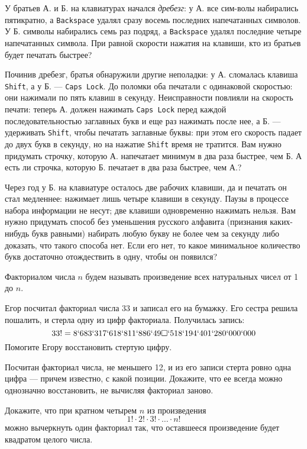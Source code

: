 \begin{itemize}
\itA У братьев А. и Б. на клавиатурах начался {\itshape дребезг}: у А. все сим-\linebreak волы набирались пятикратно, а {\verb!Backspace!} удалял сразу восемь последних напечатанных символов. У Б. символы набирались семь раз подряд, а {\verb!Backspace!} удалял последние четыре напечатанных символа. При равной скорости нажатия на клавиши, кто из братьев будет печатать быстрее?

\itB Починив дребезг, братья обнаружили другие неполадки: у А. сломалась клавиша {\verb!Shift!}, а у Б. — {\verb!Caps Lock!}. До поломки оба печатали с одинаковой скоростью: они нажимали по пять клавиш в секунду. Неисправности повлияли на скорость печати: теперь А. должен нажимать {\verb!Caps Lock!} перед каждой последовательностью заглавных букв и еще раз нажимать после нее, а Б. — удерживать {\verb!Shift!}, чтобы печатать заглавные буквы: при этом его скорость падает до двух букв в секунду, но на нажатие {\verb!Shift!} время не тратится. Вам нужно придумать строчку, которую А. напечатает минимум в два раза быстрее, чем Б. А есть ли строчка, которую Б. печатает в два раза быстрее, чем А.?

\itC Через год у Б. на клавиатуре осталось две рабочих клавиши, да и печатать он стал медленнее: нажимает лишь четыре клавиши в секунду. Паузы в процессе набора информации не несут;  две клавиши одновременно нажимать нельзя. Вам нужно придумать способ без уменьшения русского алфавита (признания каких-нибудь букв равными) набирать любую букву не более чем за секунду либо доказать, что такого способа нет. Если его нет, то какое минимальное количество букв достаточно отождествить в одну, чтобы он появился?
\end{itemize}

Факториалом числа $n$ будем называть произведение всех натуральных чисел от 1 до $n$.

\begin{itemize}
\itA Егор посчитал факториал числа 33 и записал его на бумажку. Его сестра решила пошалить, и стерла одну из цифр факториала. Получилась запись:
	$$33! = 8`683`317`618`811`886`49\square`518`194`401`280`000`000$$
Помогите Егору восстановить стертую цифру.

\itB Посчитан факториал числа, не меньшего 12, и из его записи стерта ровно одна цифра — причем известно, с какой позиции. Докажите, что ее всегда можно однозначно восстановить, не вычисляя факториал заново.

\itC Докажите, что при кратном четырем $n$ из произведения
	$$1! \cdot 2! \cdot 3! \cdot \ldots \cdot n!$$
можно вычеркнуть один факториал так, что оставшееся произведение будет квадратом целого числа.
\end{itemize}


